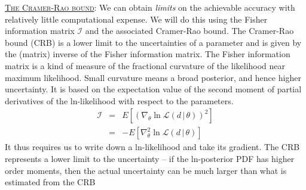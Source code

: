 \documentclass{article}
\newcommand{\given}{\,|\,}
\begin{document}
\underline{\textsc{The Cramer-Rao bound}}:
We can obtain \emph{limits} on the achievable accuracy with relatively little computational expense.
We will do this using the Fisher information matrix $\mathcal{I}$ and the associated Cramer-Rao bound.
The Cramer-Rao bound (CRB) is a lower limit to the uncertainties of a parameter and is given by the (matrix) inverse of the Fisher information matrix.
The Fisher information matrix is a kind of measure of the fractional curvature of the likelihood near maximum likelihood. 
Small curvature means a broad posterior, and hence higher uncertainty.
It is based on the  expectation value of the second moment of partial derivatives of the ln-likelihood with respect to the parameters.
\begin{eqnarray}
\mathcal{I} & = & E\left[\left(\nabla_\theta \ln \mathcal{L}(d \given \theta)\right)^2\right] \\
 & = & -E\left[\nabla^2_\theta \ln \mathcal{L}(d \given \theta)\right]
\end{eqnarray}
It thus requires us to write down a ln-likelihood and take its gradient.
The CRB represents a lower limit to the uncertainty -- 
if the ln-posterior PDF has higher order moments, then the actual uncertainty can be much larger than what is estimated from the CRB
\end{document}
